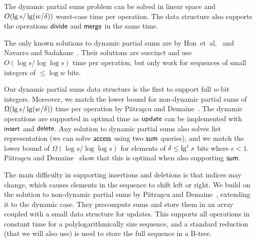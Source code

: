 \begin{theorem}\label{thm:partialsums}
    The dynamic partial sums problem can be solved in linear space and $O(\lg s / \lg (w / \delta))$ worst-case time per operation. The data structure also supports the operations $\mathsf{divide}$ and $\mathsf{merge}$ in the same time.
\end{theorem}

\noindent The only known solutions to dynamic partial sums are by Hon~et~al.~\cite{hon2011a} and Navarro and Sadakane~\cite{navarro2014fully}. Their solutions are succinct and use $O(\log s / \log \log s)$ time per operation, but only work for sequences of small integers of $\leq \log w$ bits.

Our dynamic partial sums data structure is the first to support full $w$-bit integers. Moreover, we match the lower bound for non-dynamic partial sums of $\Omega(\lg s / \lg (w / \delta))$ time per operation by Pătraşcu and Demaine~\cite{puaatracscu2004tight}. 
The dynamic operations are supported in optimal time as $\mathsf{update}$ can be implemented with $\mathsf{insert}$ and $\mathsf{delete}$.
Any solution to dynamic partial sums also solves list representation (we can solve $\mathsf{access}$ using two $\mathsf{sum}$ queries), and we match the lower bound of $\Omega(\log s / \log \log s)$ for elements of $\delta \leq \lg^\upvarepsilon s$ bits where $\epsilon < 1$. 
Pătraşcu and Demaine~\cite{puaatracscu2004tight} show that this is optimal when also supporting $\mathsf{sum}$.


The main difficulty in supporting insertions and deletions is that indices may change, which causes elements in the sequence to shift left or right. We build on the solution to non-dynamic partial sums by Pătraşcu and Demaine~\cite{puaatracscu2004tight}, extending it to the dynamic case. 
They precompute sums and store them in an array coupled with a small data structure for updates. This supports all operations in constant time for a polylogarithmically size sequence, and a standard reduction (that we will also use) is used to store the full sequence in a B-tree.

